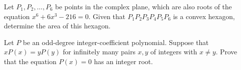 \documentclass[11pt]{article}
\theoremstyle{definition}
\begin{document}
%	





\begin{question}[name={2016 HMMT, November Theme, \href{https://artofproblemsolving.com/community/c129h1342704p7297971}{Problem 6}}]
	Let $P_1, P_2, \ldots, P_6$ be points in the complex plane, which are also roots of the equation $x^6+6x^3-216=0$. Given that $P_1P_2P_3P_4P_5P_6$ is a convex hexagon, determine the area of this hexagon.	
\end{question}




%	








\begin{question}[name={2016 HMIC, \href{https://artofproblemsolving.com/community/c6h1231860p6230966}{Problem 4}}]
	Let $P$ be an odd-degree integer-coefficient polynomial. Suppose that $xP(x)=yP(y)$ for infinitely many pairs $x,y$ of integers with $x\ne y$. Prove that the equation $P(x)=0$ has an integer root.
\end{question}
\end{document}
